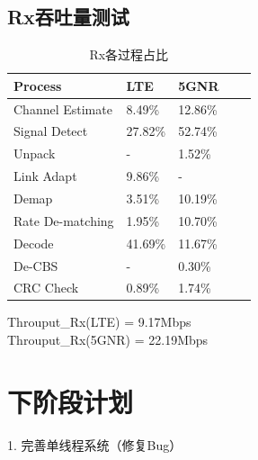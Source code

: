 \documentclass{article}
\begin{document}
\subsection{Rx吞吐量测试}
\begin{table}[H]
	\caption{Rx各过程占比}
	\centering
	\begin{tabular}{|l|l|l|l|l|}%
		\hline  %
		Process				& LTE		& 5GNR		\\
		\hline
		Channel Estimate	& 8.49\%	& 12.86\%	\\
		\hline
		Signal Detect		& 27.82\%	& 52.74\%	\\
		\hline
		Unpack				& -			& 1.52\%	\\
		\hline
		Link Adapt			& 9.86\%	& -			\\
		\hline
		Demap				& 3.51\%	& 10.19\%	\\
		\hline
		Rate De-matching	& 1.95\%	& 10.70\%	\\
		\hline
		Decode				& 41.69\%	& 11.67\%	\\
		\hline
		De-CBS				& -			& 0.30\%	\\
		\hline
		CRC Check			& 0.89\%	& 1.74\%	\\
		\hline  %
	\end{tabular}
\end{table}
Throuput\_Rx(LTE) = 9.17Mbps \\
Throuput\_Rx(5GNR) = 22.19Mbps


\section{下阶段计划}
1. 完善单线程系统（修复Bug）
\end{document}
